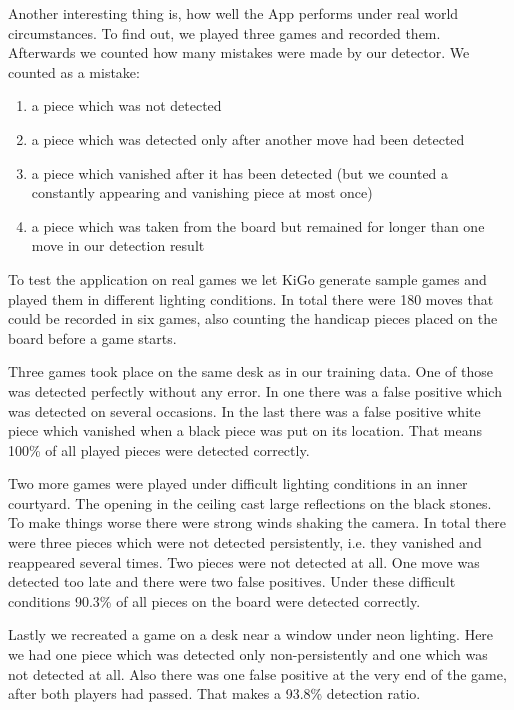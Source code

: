 	Another interesting thing is, how well the App performs under real world circumstances. To find out, we played three games and recorded them. Afterwards we counted how many mistakes were made by our detector. We counted as a mistake:
	\begin{enumerate}
		\item a piece which was not detected
		\item a piece which was detected only after another move had been detected
		\item a piece which vanished after it has been detected (but we counted a constantly appearing and vanishing piece at most once)
		\item a piece which was taken from the board but remained for longer than one move in our detection result
	\end{enumerate}

	To test the application on real games we let KiGo generate sample games and played them in different lighting conditions. In total there were 180 moves that could be recorded in six games, also counting the handicap pieces placed on the board before a game starts.

	Three games took place on the same desk as in our training data. One of those was detected perfectly without any error. In one there was a false positive which was detected on several occasions. In the last there was a false positive white piece which vanished when a black piece was put on its location. That means 100\% of all played pieces were detected correctly.

	Two more games were played under difficult lighting conditions in an inner courtyard. The opening in the ceiling cast large reflections on the black stones. To make things worse there were strong winds shaking the camera. In total there were three pieces which were not detected persistently, i.e. they vanished and reappeared several times. Two pieces were not detected at all. One move was detected too late and there were two false positives. Under these difficult conditions 90.3\% of all pieces on the board were detected correctly.

	Lastly we recreated a game on a desk near a window under neon lighting. Here we had one piece which was detected only non-persistently and one which was not detected at all. Also there was one false positive at the very end of the game, after both players had passed. That makes a 93.8\% detection ratio.

